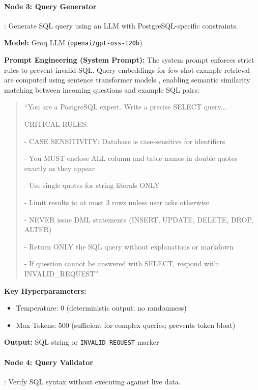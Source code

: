 \documentclass{article}
\begin{document}
\paragraph{Node 3: Query Generator}: Generate SQL query using an LLM with PostgreSQL-specific constraints.

\noindent\textbf{Model:} Groq LLM (\texttt{openai/gpt-oss-120b})

\noindent\textbf{Prompt Engineering (System Prompt):} The system prompt enforces strict rules to prevent invalid SQL. Query embeddings for few-shot example retrieval are computed using sentence transformer models \cite{reimers2019sbert}, enabling semantic similarity matching between incoming questions and example SQL pairs:

\begin{quote}
\ttfamily
``You are a PostgreSQL expert. Write a precise SELECT query...

CRITICAL RULES:

- CASE SENSITIVITY: Database is case-sensitive for identifiers

- You MUST enclose ALL column and table names in double quotes exactly as they appear

- Use single quotes for string literals ONLY

- Limit results to at most 3 rows unless user asks otherwise

- NEVER issue DML statements (INSERT, UPDATE, DELETE, DROP, ALTER)

- Return ONLY the SQL query without explanations or markdown

- If question cannot be answered with SELECT, respond with: INVALID\_REQUEST''
\end{quote}

\noindent\textbf{Key Hyperparameters:}
\begin{itemize}
    \item Temperature: 0 (deterministic output; no randomness)
    \item Max Tokens: 500 (sufficient for complex queries; prevents token bloat)
\end{itemize}

\noindent\textbf{Output:} SQL string or \texttt{INVALID\_REQUEST} marker

\paragraph{Node 4: Query Validator}: Verify SQL syntax without executing against live data.
\end{document}
